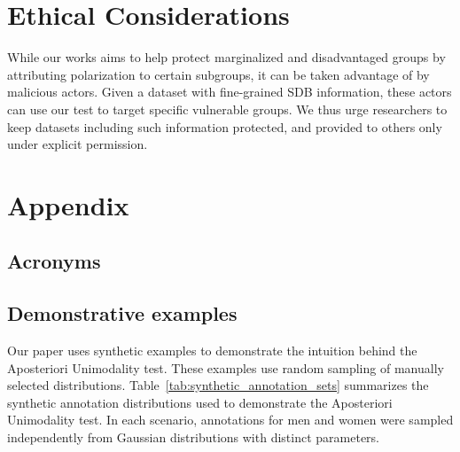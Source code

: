 \documentclass[twocolumn, 8pt]{article}
\begin{document}
\section{Ethical Considerations}

While our works aims to help protect marginalized and disadvantaged groups by attributing polarization to certain subgroups, it can be taken advantage of by malicious actors. Given a dataset with fine-grained \ac{SDB} information, these actors can use our test to target specific vulnerable groups. We thus urge researchers to keep datasets including such information protected, and provided to others only under explicit permission.

\printbibliography


\appendix
\section{Appendix}

\subsection{Acronyms}

\begin{acronym}[WWW]
\end{acronym}


\subsection{Demonstrative examples}

Our paper uses synthetic examples to demonstrate the intuition behind the Aposteriori Unimodality test. These examples use random sampling of manually selected distributions. Table~\ref{tab:synthetic_annotation_sets} summarizes the synthetic annotation distributions used to demonstrate the Aposteriori Unimodality test. In each scenario, annotations for men and women were sampled independently from Gaussian distributions with distinct parameters.
\end{document}
